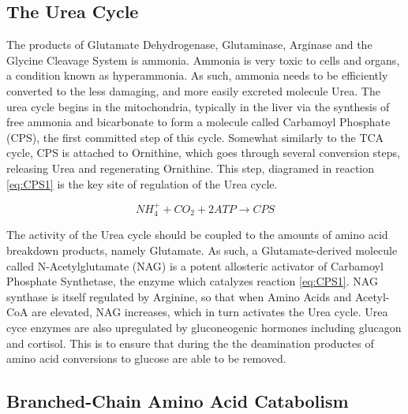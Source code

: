 \documentclass{tufte-handout}
\begin{document}
\subsection{The Urea Cycle}

The products of Glutamate Dehydrogenase, Glutaminase, Arginase and the Glycine Cleavage System is ammonia.  Ammonia is very toxic to cells and organs, a condition known as hyperammonia.  As such, ammonia needs to be efficiently converted to the less damaging, and more easily excreted molecule Urea.  The urea cycle begins in the mitochondria, typically in the liver via the synthesis of free ammonia and bicarbonate to form a molecule called Carbamoyl Phosphate (CPS), the first committed step of this cycle.  Somewhat similarly to the TCA cycle, CPS is attached to Ornithine, which goes through several conversion steps, releasing Urea and regenerating Ornithine.  This step, diagramed in reaction \ref{eq:CPS1} is the key site of regulation of the Urea cycle.

\begin{equation}\label{eq:CPS1}
 NH_4^+ + CO_2 + 2 ATP \rightarrow  CPS
\end{equation}

  The activity of the Urea cycle should be coupled to the amounts of amino acid breakdown products, namely Glutamate.  As such, a Glutamate-derived molecule called N-Acetylglutamate (NAG) is a potent allosteric activator of Carbamoyl Phosphate Synthetase, the enzyme which catalyzes reaction \ref{eq:CPS1}.  NAG synthase is itself regulated by Arginine, so that when Amino Acids and Acetyl-CoA are elevated, NAG increases, which in turn activates the Urea cycle.  Urea cyce enzymes are also upregulated by gluconeogenic hormones including glucagon and cortisol.  This is to ensure that during the the deamination productes of amino acid conversions to glucose are able to be removed.

\subsection{Branched-Chain Amino Acid Catabolism}
\end{document}
